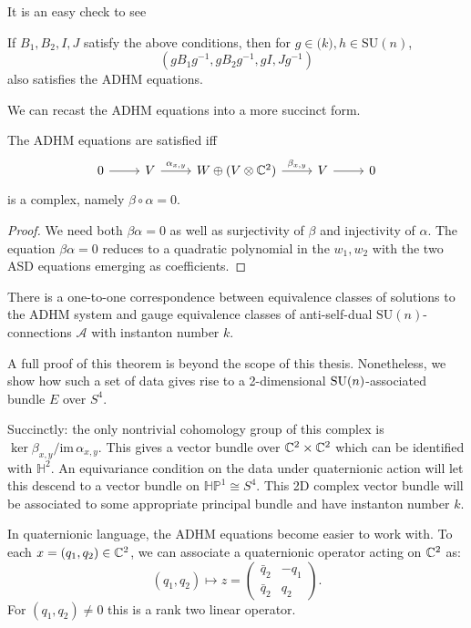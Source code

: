 	It is an easy check to see
	\begin{obs}
		If $B_1, B_2, I, J$ satisfy the above conditions, then for $g \in \mathrm(k), h \in \mathrm{SU}(n)$, 
		\[
			(g B_1 g^{-1}, g B_2 g^{-1}, gI, Jg^{-1})
		\]
		also satisfies the ADHM equations.
	\end{obs}
	
	We can recast the ADHM equations into a more succinct form.
	\begin{prop}
		The ADHM equations are satisfied iff
		\[
		\begin{tikzcd}
			0 \arrow[r]&V \arrow[r,"\alpha_{x,y}"] & W \oplus (V \otimes \cc^2) \arrow[r,"\beta_{x,y}"] & V \arrow[r] & 0
		\end{tikzcd}
		\]
		is a complex, namely $\beta \circ \alpha = 0$.
	\end{prop}
	\begin{proof}
		We need both $\beta \alpha = 0$ as well as surjectivity of $\beta$ and injectivity of $\alpha$. The equation $\beta \alpha = 0$ reduces to a quadratic polynomial in the $w_1, w_2$ with the two ASD equations emerging as coefficients.
	\end{proof}
	
	
	\begin{theorem}
		There is a one-to-one correspondence between equivalence classes of solutions to the ADHM system and gauge equivalence classes of anti-self-dual $\mathrm{SU}(n)$-connections $\mathcal A$ with instanton number $k$.
	\end{theorem}
	
	A full proof of this theorem is beyond the scope of this thesis. Nonetheless, we show how such a set of data gives rise to a 2-dimensional $\mathrm{SU}(n)$-associated bundle $E$ over $S^4$. 
	
	Succinctly: the only nontrivial cohomology group of this complex is $\ker \beta_{x,y}/ \mathrm{im}\, \alpha_{x,y}$. This gives a vector bundle over $\mathbb{C}^2 \times \mathbb{C}^2$ which can be identified with $\mathbb H^2$. An equivariance condition on the data under quaternionic action will let this descend to a vector bundle on $\mathbb{HP}^1 \cong S^4$. This 2D complex vector bundle will be associated to some appropriate principal bundle and have instanton number $k$.
	
	In quaternionic language, the ADHM equations become easier to work with. To each $x = (q_1, q_2) \in \mathbb{C}^2$, we can associate a quaternionic operator acting on $\mathbb{C}^2$ as:
	\begin{equation}
		(q_1, q_2) \mapsto z = \begin{pmatrix}
			\bar q_2 & -q_1\\
			\bar q_2 & q_2
		\end{pmatrix}.
	\end{equation}
	For $(q_1, q_2) \neq 0$ this is a rank two linear operator.
	
